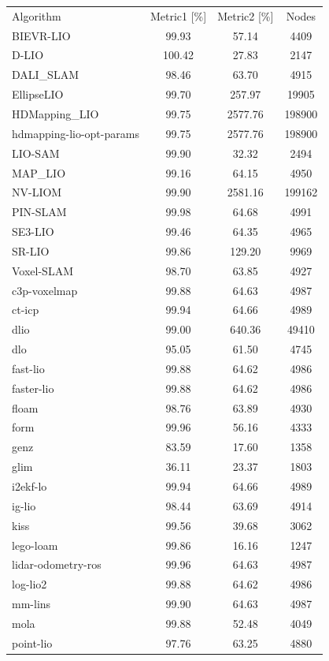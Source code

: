 \begin{table}[]
\centering
\begin{tabular}{lccc}
\rowcolor[HTML]{C0C0C0}
Algorithm & Metric1 [\%] & Metric2 [\%] & Nodes \\
BIEVR-LIO & 99.93 & 57.14 & 4409 \\
D-LIO & 100.42 & 27.83 & 2147 \\
DALI_SLAM & 98.46 & 63.70 & 4915 \\
EllipseLIO & 99.70 & 257.97 & 19905 \\
HDMapping_LIO & 99.75 & 2577.76 & 198900 \\
hdmapping-lio-opt-params & 99.75 & 2577.76 & 198900 \\
LIO-SAM & 99.90 & 32.32 & 2494 \\
MAP_LIO & 99.16 & 64.15 & 4950 \\
NV-LIOM & 99.90 & 2581.16 & 199162 \\
PIN-SLAM & 99.98 & 64.68 & 4991 \\
SE3-LIO & 99.46 & 64.35 & 4965 \\
SR-LIO & 99.86 & 129.20 & 9969 \\
Voxel-SLAM & 98.70 & 63.85 & 4927 \\
c3p-voxelmap & 99.88 & 64.63 & 4987 \\
ct-icp & 99.94 & 64.66 & 4989 \\
dlio & 99.00 & 640.36 & 49410 \\
dlo & 95.05 & 61.50 & 4745 \\
fast-lio & 99.88 & 64.62 & 4986 \\
faster-lio & 99.88 & 64.62 & 4986 \\
floam & 98.76 & 63.89 & 4930 \\
form & 99.96 & 56.16 & 4333 \\
genz & 83.59 & 17.60 & 1358 \\
glim & 36.11 & 23.37 & 1803 \\
i2ekf-lo & 99.94 & 64.66 & 4989 \\
ig-lio & 98.44 & 63.69 & 4914 \\
kiss & 99.56 & 39.68 & 3062 \\
lego-loam & 99.86 & 16.16 & 1247 \\
lidar-odometry-ros & 99.96 & 64.63 & 4987 \\
log-lio2 & 99.88 & 64.62 & 4986 \\
mm-lins & 99.90 & 64.63 & 4987 \\
mola & 99.88 & 52.48 & 4049 \\
point-lio & 97.76 & 63.25 & 4880 \\

\end{tabular}
\end{table}
